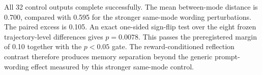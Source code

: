 All 32 control outputs complete successfully. The mean between-mode distance is 0.700, compared with 0.595 for the stronger same-mode wording perturbations. The paired excess is 0.105. An exact one-sided sign-flip test over the eight frozen trajectory-level differences gives $p=0.0078$. This passes the preregistered margin of 0.10 together with the $p<0.05$ gate. The reward-conditioned reflection contrast therefore produces memory separation beyond the generic prompt-wording effect measured by this stronger same-mode control.
